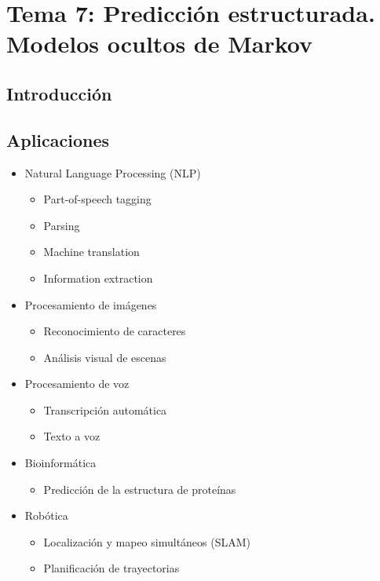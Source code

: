 \chapter{Tema 7: Predicción estructurada. Modelos ocultos de Markov}

\section{Introducción}


\section{Aplicaciones}

\begin{itemize}
    \item Natural Language Processing (NLP)
    \begin{itemize}
        \item Part-of-speech tagging
        \item Parsing
        \item Machine translation
        \item Information extraction
    \end{itemize}
    \item Procesamiento de imágenes
    \begin{itemize}
        \item Reconocimiento de caracteres
        \item Análisis visual de escenas
    \end{itemize}
    \item Procesamiento de voz
    \begin{itemize}
        \item Transcripción automática
        \item Texto a voz
    \end{itemize}
    \item Bioinformática
    \begin{itemize}
        \item Predicción de la estructura de proteínas
    \end{itemize}
    \item Robótica
    \begin{itemize}
        \item Localización y mapeo simultáneos (SLAM)
        \item Planificación de trayectorias
    \end{itemize}
\end{itemize}

